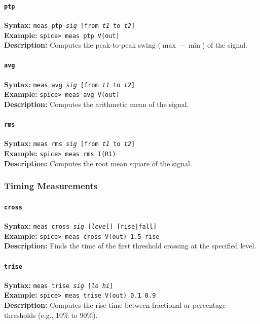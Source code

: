 \paragraph{\texttt{ptp}}
\textbf{Syntax:} \texttt{meas ptp \textit{sig} [from \textit{t1} to \textit{t2}]}\\
\textbf{Example:} \texttt{spice> meas ptp V(out)}\\
\textbf{Description:} Computes the peak-to-peak swing ($\max - \min$) of the signal.

\paragraph{\texttt{avg}}
\textbf{Syntax:} \texttt{meas avg \textit{sig} [from \textit{t1} to \textit{t2}]}\\
\textbf{Example:} \texttt{spice> meas avg V(out)}\\
\textbf{Description:} Computes the arithmetic mean of the signal.

\paragraph{\texttt{rms}}
\textbf{Syntax:} \texttt{meas rms \textit{sig} [from \textit{t1} to \textit{t2}]}\\
\textbf{Example:} \texttt{spice> meas rms I(R1)}\\
\textbf{Description:} Computes the root mean square of the signal.

\subsubsection{Timing Measurements}

\paragraph{\texttt{cross}}
\textbf{Syntax:} \texttt{meas cross \textit{sig} [\textit{level}] [rise|fall]}\\
\textbf{Example:} \texttt{spice> meas cross V(out) 1.5 rise}\\
\textbf{Description:} Finds the time of the first threshold crossing at the specified level.

\paragraph{\texttt{trise}}
\textbf{Syntax:} \texttt{meas trise \textit{sig} [\textit{lo} \textit{hi}]}\\
\textbf{Example:} \texttt{spice> meas trise V(out) 0.1 0.9}\\
\textbf{Description:} Computes the rise time between fractional or percentage thresholds (e.g., 10\% to 90\%).

